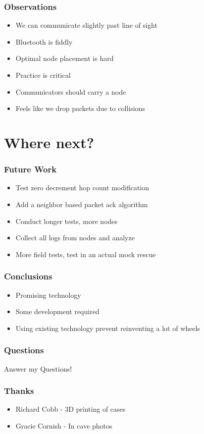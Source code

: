 \documentclass{beamer}
\begin{document}
\begin{frame}

\frametitle{Observations}

\begin{itemize}
\item We can communicate slightly past line of sight
\item Bluetooth is fiddly
\item Optimal node placement is hard
\item Practice is critical
\item Communicators should carry a node
\item Feels like we drop packets due to collisions
\end{itemize}

\end{frame}

\section{Where next?}

\begin{frame}
\frametitle{Future Work}

\begin{itemize}
\item Test zero decrement hop count modification
\item Add a neighbor based packet ack algorithm
\item Conduct longer tests, more nodes
\item Collect all logs from nodes and analyze
\item More field tests, test in an actual mock rescue
\end{itemize}

\end{frame}


\begin{frame}
\frametitle{Conclusions}

\begin{itemize}
\item Promising technology
\item Some development required
\item Using existing technology prevent reinventing a lot of wheels
\end{itemize}
\end{frame}

\begin{frame}
\frametitle{Questions}

Answer my Questions!

\end{frame}

\begin{frame}
\frametitle{Thanks}

\begin{itemize}
\item Richard Cobb - 3D printing of cases
\item Gracie Cornish - In cave photos
\end{itemize}

\end{frame}
\end{document}
